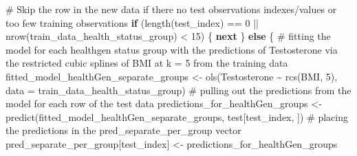 \documentclass[
  letterpaper,
  DIV=11,
  numbers=noendperiod]{scrreprt}
\newenvironment{Shaded}{\begin{snugshade}}{\end{snugshade}}
\newcommand{\AttributeTok}[1]{\textcolor[rgb]{0.40,0.45,0.13}{#1}}
\newcommand{\CommentTok}[1]{\textcolor[rgb]{0.37,0.37,0.37}{#1}}
\newcommand{\ControlFlowTok}[1]{\textcolor[rgb]{0.00,0.23,0.31}{\textbf{#1}}}
\newcommand{\DecValTok}[1]{\textcolor[rgb]{0.68,0.00,0.00}{#1}}
\newcommand{\FunctionTok}[1]{\textcolor[rgb]{0.28,0.35,0.67}{#1}}
\newcommand{\NormalTok}[1]{\textcolor[rgb]{0.00,0.23,0.31}{#1}}
\newcommand{\OtherTok}[1]{\textcolor[rgb]{0.00,0.23,0.31}{#1}}
\newcommand{\SpecialCharTok}[1]{\textcolor[rgb]{0.37,0.37,0.37}{#1}}
\begin{document}
{\begin{Shaded}
\begin{Highlighting}[]
    \CommentTok{\# Skip the row in the new data if there no test observations indexes/values or too few training observations}
    \ControlFlowTok{if}\NormalTok{ (}\FunctionTok{length}\NormalTok{(test\_index) }\SpecialCharTok{==} \DecValTok{0} \SpecialCharTok{||} \FunctionTok{nrow}\NormalTok{(train\_data\_health\_status\_group) }\SpecialCharTok{\textless{}} \DecValTok{15}\NormalTok{) \{}
      \ControlFlowTok{next}
\NormalTok{    \} }\ControlFlowTok{else}\NormalTok{ \{}
    \CommentTok{\# fitting the model for each healthgen status group with the predictions of Testosterone via the restricted cubic splines of BMI at k = 5 from the training data}
\NormalTok{      fitted\_model\_healthGen\_separate\_groups }\OtherTok{\textless{}{-}} \FunctionTok{ols}\NormalTok{(Testosterone }\SpecialCharTok{\textasciitilde{}} \FunctionTok{rcs}\NormalTok{(BMI, }\DecValTok{5}\NormalTok{), }\AttributeTok{data =}\NormalTok{ train\_data\_health\_status\_group)}
    \CommentTok{\# pulling out the predictions from the model for each row of the test data}
\NormalTok{      predictions\_for\_healthGen\_groups }\OtherTok{\textless{}{-}} \FunctionTok{predict}\NormalTok{(fitted\_model\_healthGen\_separate\_groups, test[test\_index, ])}
      \CommentTok{\# placing the predictions in the pred\_separate\_per\_group vector}
\NormalTok{      pred\_separate\_per\_group[test\_index] }\OtherTok{\textless{}{-}}\NormalTok{ predictions\_for\_healthGen\_groups}
      

\end{Highlighting}
\end{Shaded}}
\end{document}
